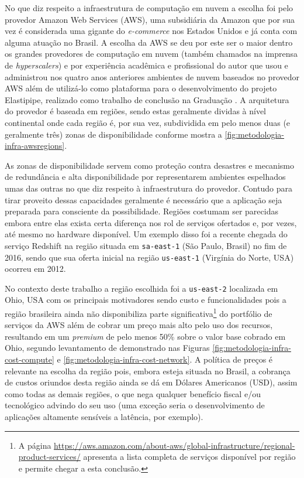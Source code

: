 \documentclass[english,brazilian]{UNISINOSmonografia} %
\begin{document}
No que diz respeito a infraestrutura de computação em nuvem a escolha foi pelo provedor Amazon Web Services (AWS), uma subsidiária da Amazon que por sua vez é considerada uma gigante do \textit{e-commerce} nos Estados Unidos e já conta com alguma atuação no Brasil.
%
A escolha da AWS se deu por este ser o maior dentro os grandes provedores de computação em nuvem (também chamados na imprensa de \textit{hyperscalers}) e por experiência acadêmica e profissional do autor que usou e administrou nos quatro anos anteriores ambientes de nuvem baseados no provedor AWS além de utilizá-lo como plataforma para o desenvolvimento do projeto Elastipipe, realizado como trabalho de conclusão na Graduação \cite{Aubin2015,Aubin2016,Aubin2017}.
%
A arquitetura do provedor é baseada em regiões, sendo estas geralmente dividas à nível continental onde cada região é, por sua vez, subdividida em pelo menos duas (e geralmente três) zonas de disponibilidade conforme mostra a \autoref{fig:metodologia-infra-awsregions}.


As zonas de disponibilidade servem como proteção contra desastres e mecanismo de redundância e alta disponibilidade por representarem ambientes espelhados umas das outras no que diz respeito à infraestrutura do provedor.
%
Contudo para tirar proveito dessas capacidades geralmente é necessário que a aplicação seja preparada para consciente da possibilidade.
Regiões costumam ser parecidas embora entre elas exista certa diferença nos rol de serviços ofertados e, por vezes, até mesmo no hardware disponível.
%
Um exemplo disso foi a recente chegada do serviço Redshift na região situada em \texttt{sa-east-1} (São Paulo, Brasil) no fim de 2016, sendo que sua oferta inicial na região \texttt{us-east-1} (Virgínia do Norte, USA) ocorreu em 2012.


No contexto deste trabalho a região escolhida foi a \texttt{us-east-2} localizada em Ohio, USA com os principais motivadores sendo custo e funcionalidades pois a região brasileira ainda não disponibiliza parte significativa\footnote{
	A página \url{https://aws.amazon.com/about-aws/global-infrastructure/regional-product-services/} apresenta a lista completa de serviços disponível por região e permite chegar a esta conclusão.
}
do portfólio de serviços da AWS além de cobrar um preço mais alto pelo uso dos recursos, resultando em um \textit{premium} de pelo menos 50\% sobre o valor base cobrado em Ohio, segundo levantamento de  demonstrado nas Figuras \ref{fig:metodologia-infra-cost-compute} e \ref{fig:metodologia-infra-cost-network}.
%
A política de preços é relevante na escolha da região pois, embora esteja situada no Brasil, a cobrança de custos oriundos desta região ainda se dá em Dólares Americanos (USD), assim como todas as demais regiões, o que nega qualquer benefício fiscal e/ou tecnológico advindo do seu uso (uma exceção seria o desenvolvimento de aplicações altamente sensíveis a latência, por exemplo).
\end{document}

